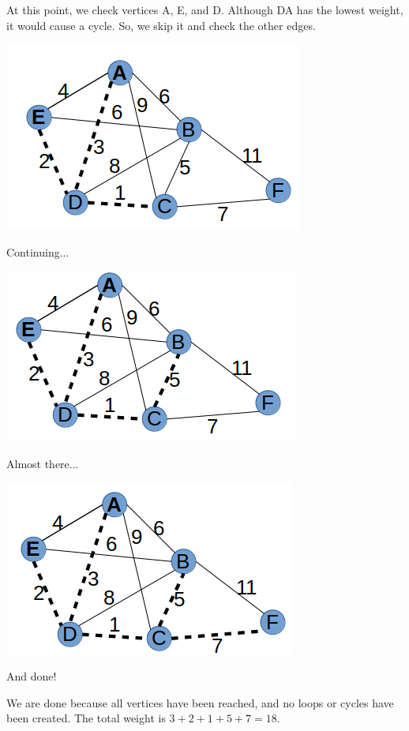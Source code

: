 \documentclass{article}
\begin{document}
At this point, we check vertices A, E, and D. Although DA has the lowest weight, it would cause a cycle. So, we skip it and check the other edges. 

\includegraphics[scale=0.5]{./P13/prims/3}

Continuing...

\includegraphics[scale=0.5]{./P13/prims/4}

Almost there...


\includegraphics[scale=0.5]{./P13/prims/5}

And done!




We are done because all vertices have been reached, and no loops or cycles have been created. The total weight is $3+2+1+5+7=\boxed{18}$.
\end{document}
